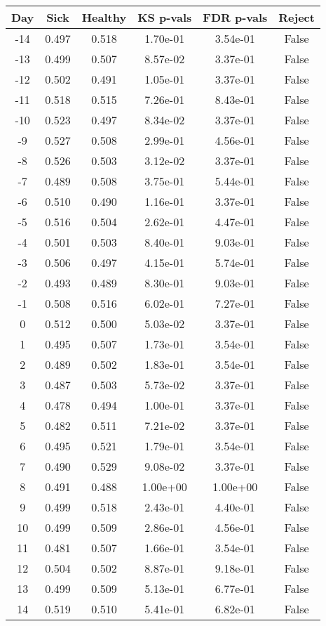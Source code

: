 \begin{tabular}{c|c|c|c|c|c}
Day &  Sick & Healthy &  KS p-vals & FDR p-vals & Reject\\
\hline
-14 & 0.497 &   0.518 &   1.70e-01 &   3.54e-01 &  False\\
-13 & 0.499 &   0.507 &   8.57e-02 &   3.37e-01 &  False\\
-12 & 0.502 &   0.491 &   1.05e-01 &   3.37e-01 &  False\\
-11 & 0.518 &   0.515 &   7.26e-01 &   8.43e-01 &  False\\
-10 & 0.523 &   0.497 &   8.34e-02 &   3.37e-01 &  False\\
 -9 & 0.527 &   0.508 &   2.99e-01 &   4.56e-01 &  False\\
 -8 & 0.526 &   0.503 &   3.12e-02 &   3.37e-01 &  False\\
 -7 & 0.489 &   0.508 &   3.75e-01 &   5.44e-01 &  False\\
 -6 & 0.510 &   0.490 &   1.16e-01 &   3.37e-01 &  False\\
 -5 & 0.516 &   0.504 &   2.62e-01 &   4.47e-01 &  False\\
 -4 & 0.501 &   0.503 &   8.40e-01 &   9.03e-01 &  False\\
 -3 & 0.506 &   0.497 &   4.15e-01 &   5.74e-01 &  False\\
 -2 & 0.493 &   0.489 &   8.30e-01 &   9.03e-01 &  False\\
 -1 & 0.508 &   0.516 &   6.02e-01 &   7.27e-01 &  False\\
  0 & 0.512 &   0.500 &   5.03e-02 &   3.37e-01 &  False\\
  1 & 0.495 &   0.507 &   1.73e-01 &   3.54e-01 &  False\\
  2 & 0.489 &   0.502 &   1.83e-01 &   3.54e-01 &  False\\
  3 & 0.487 &   0.503 &   5.73e-02 &   3.37e-01 &  False\\
  4 & 0.478 &   0.494 &   1.00e-01 &   3.37e-01 &  False\\
  5 & 0.482 &   0.511 &   7.21e-02 &   3.37e-01 &  False\\
  6 & 0.495 &   0.521 &   1.79e-01 &   3.54e-01 &  False\\
  7 & 0.490 &   0.529 &   9.08e-02 &   3.37e-01 &  False\\
  8 & 0.491 &   0.488 &   1.00e+00 &   1.00e+00 &  False\\
  9 & 0.499 &   0.518 &   2.43e-01 &   4.40e-01 &  False\\
 10 & 0.499 &   0.509 &   2.86e-01 &   4.56e-01 &  False\\
 11 & 0.481 &   0.507 &   1.66e-01 &   3.54e-01 &  False\\
 12 & 0.504 &   0.502 &   8.87e-01 &   9.18e-01 &  False\\
 13 & 0.499 &   0.509 &   5.13e-01 &   6.77e-01 &  False\\
 14 & 0.519 &   0.510 &   5.41e-01 &   6.82e-01 &  False\\
\end{tabular}
